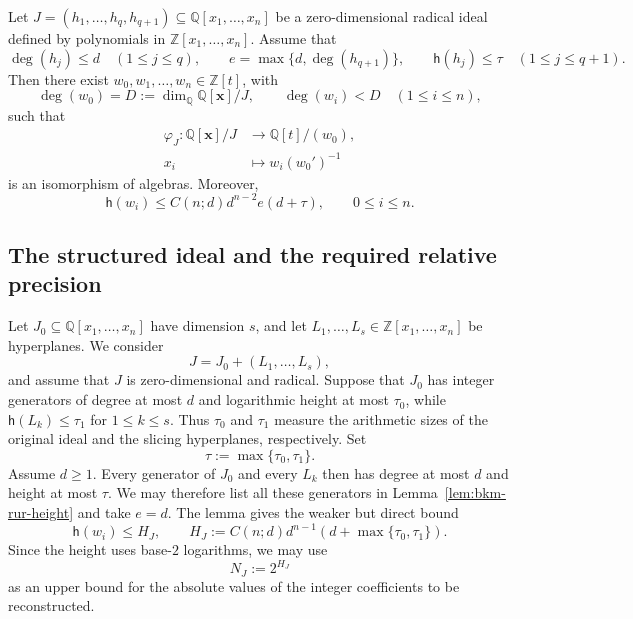 \documentclass{weeklyprogress}
\begin{document}
\begin{lemma}\label{lem:bkm-rur-height}
Let $J=(h_1,\ldots,h_q,h_{q+1})\subseteq\mathbb{Q}[x_1,\ldots,x_n]$ be a
zero-dimensional radical ideal defined by polynomials in
$\mathbb{Z}[x_1,\ldots,x_n]$.  Assume that
\[
 \deg(h_j)\leq d\quad(1\leq j\leq q),\qquad
 e=\max\{d,\deg(h_{q+1})\},\qquad
 \mathsf{h}(h_j)\leq\tau\quad(1\leq j\leq q+1).
\]
Then there exist $w_0,w_1,\ldots,w_n\in\mathbb{Z}[t]$, with
\[
 \deg(w_0)=D:=\dim_\mathbb{Q}\mathbb{Q}[\bm{x}]/J,
 \qquad \deg(w_i)<D\quad(1\leq i\leq n),
\]
such that
\[
 \begin{aligned}
 \varphi_J:\mathbb{Q}[\bm{x}]/J&\longrightarrow\mathbb{Q}[t]/(w_0),\\
 x_i&\longmapsto w_i(w_0')^{-1}
 \end{aligned}
\]
is an isomorphism of algebras.  Moreover,
\[
 \mathsf{h}(w_i)\leq C(n;d)d^{n-2}e(d+\tau),
 \qquad 0\leq i\leq n.
 \tag{2}
\]
\end{lemma}

\subsection{The structured ideal and the required relative precision}

Let $J_0\subseteq\mathbb{Q}[x_1,\ldots,x_n]$ have dimension $s$, and let
$L_1,\ldots,L_s\in\mathbb{Z}[x_1,\ldots,x_n]$ be hyperplanes.  We consider
\[
 J=J_0+(L_1,\ldots,L_s),
\]
and assume that $J$ is zero-dimensional and radical.  Suppose that $J_0$
has integer generators of degree at most $d$ and logarithmic height at most
$\tau_0$, while $\mathsf{h}(L_k)\leq\tau_1$ for $1\leq k\leq s$.  Thus
$\tau_0$ and $\tau_1$ measure the arithmetic sizes of the original ideal
and the slicing hyperplanes, respectively.  Set
\[
 \tau:=\max\{\tau_0,\tau_1\}.
\]
Assume $d\geq1$.  Every generator of $J_0$ and every $L_k$ then has degree
at most $d$ and height at most $\tau$.  We may therefore list all these
generators in Lemma~\ref{lem:bkm-rur-height} and take $e=d$.  The lemma gives
the weaker but direct bound
\[
 \mathsf{h}(w_i)\leq H_J,
 \qquad
 H_J:=C(n;d)d^{n-1}
       \left(d+\max\{\tau_0,\tau_1\}\right).
 \tag{3}
\]
Since the height uses base-$2$ logarithms, we may use
\[
 N_J:=2^{H_J}
 \tag{4}
\]
as an upper bound for the absolute values of the integer coefficients to be
reconstructed.
\end{document}

